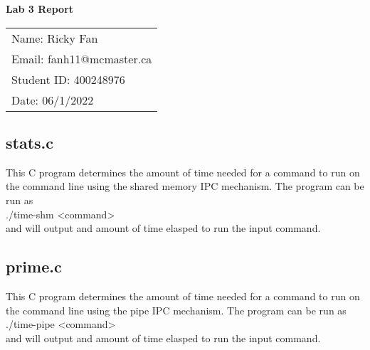 \documentclass[11pt,fleqn]{article}
\begin{document}
\begin{center}
	{\Large \textbf{Lab 3 Report}}\\[6mm]
	\begin{tabular}{l}
        {\large Name: Ricky Fan}       \\
		{\large Email: fanh11@mcmaster.ca} \\
		{\large Student ID: 400248976}    \\
		{\large Date: 06/1/2022}
	\end{tabular}

\end{center}

\medskip

\subsection*{stats.c}
This C program determines the amount of time needed for a command to run 
on the command line using the shared memory IPC mechanism. 
The program can be run as \\

./time-shm \textless command\textgreater \\

\noindent
and will output and amount of time elasped to run the input command. 




\medskip

\subsection*{prime.c}
This C program determines the amount of time needed for a command to run 
on the command line using the pipe IPC mechanism. 
The program can be run as \\

./time-pipe \textless command\textgreater \\

\noindent
and will output and amount of time elasped to run the input command. 

\noindent 


\end{document}
